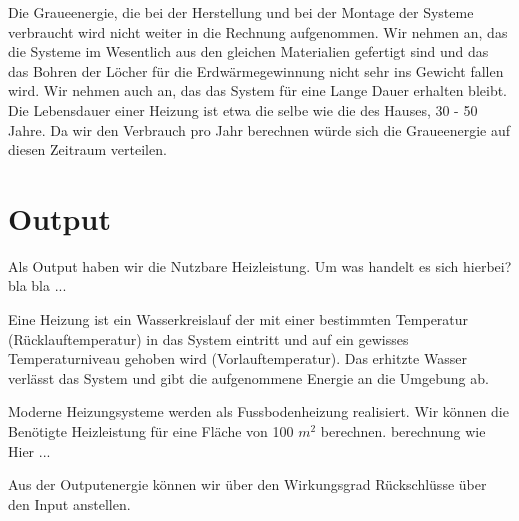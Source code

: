 Die Graueenergie, die bei der Herstellung und bei der Montage der Systeme
verbraucht wird nicht weiter in die Rechnung aufgenommen.
Wir nehmen an, das die Systeme im Wesentlich aus den gleichen Materialien
gefertigt sind und das  das Bohren der Löcher für die Erdwärmegewinnung
nicht sehr ins Gewicht fallen wird.
Wir nehmen auch an, das das System für eine Lange Dauer erhalten bleibt.
Die Lebensdauer einer Heizung ist etwa die selbe wie die des Hauses, 
30 - 50 Jahre.
Da wir den Verbrauch pro Jahr berechnen würde sich die Graueenergie auf diesen
Zeitraum verteilen.

\section{Output}

Als Output haben wir die Nutzbare Heizleistung.
Um was handelt es sich hierbei?
bla bla ...

Eine Heizung ist ein Wasserkreislauf der mit einer bestimmten Temperatur
(Rücklauftemperatur) in das System eintritt und auf ein gewisses Temperaturniveau
gehoben wird (Vorlauftemperatur). Das erhitzte Wasser verlässt das System und
gibt die aufgenommene Energie an die Umgebung ab.
 
Moderne Heizungsysteme werden als Fussbodenheizung realisiert.
Wir können die Benötigte Heizleistung für eine Fläche von 100 $m^2$
berechnen.
berechnung wie Hier ...

Aus der Outputenergie können wir über den Wirkungsgrad Rückschlüsse über
den Input anstellen.










